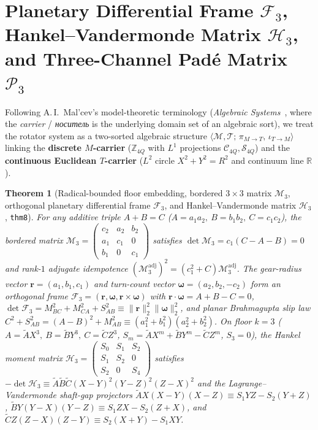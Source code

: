\documentclass[11pt,a4paper]{article}
\theoremstyle{plain}
\newtheorem{theorem}{Theorem}[section]
\theoremstyle{definition}
\begin{document}
\section{Planetary Differential Frame \texorpdfstring{$\mathcal{F}_3$}{F3}, Hankel--Vandermonde Matrix \texorpdfstring{$\mathcal{H}_3$}{H3}, and Three-Channel Pad\'e Matrix \texorpdfstring{$\mathcal{P}_3$}{P3}}
\label{sec:planetary-frame}

Following A.\,I.~Mal'cev's model-theoretic terminology (\emph{Algebraic Systems}~\cite{Malcev1973}, where the \emph{carrier} / \emph{носитель} is the underlying domain set of an algebraic sort), we treat the rotator system as a two-sorted algebraic structure $\langle\mathcal{M},\mathcal{T};\,\pi_{M\to T},\,\iota_{T\to M}\rangle$ linking the \textbf{discrete $M$-carrier} ($\mathbb{Z}_{4Q}$ with $L^1$ projections $\mathcal{C}_{4Q},\mathcal{S}_{4Q}$) and the \textbf{continuous Euclidean $T$-carrier} ($L^2$ circle $X^2+Y^2=R^2$ and continuum line $\mathbb{R}$).

\begin{theorem}[Radical-bounded floor embedding, bordered $3\times 3$ matrix $\mathcal{M}_3$, orthogonal planetary differential frame $\mathcal{F}_3$, and Hankel--Vandermonde matrix $\mathcal{H}_3$, \texttt{thm8}]
\label{thm:main-8}
For any additive triple $A + B = C$ ($A = a_1 a_2,\ B = b_1 b_2,\ C = c_1 c_2$), the bordered matrix $\mathcal{M}_3 = \begin{pmatrix} c_2 & a_2 & b_2 \\ a_1 & c_1 & 0 \\ b_1 & 0 & c_1 \end{pmatrix}$ satisfies $\det\mathcal{M}_3 = c_1(C-A-B) = 0$ and rank-$1$ adjugate idempotence $(\mathcal{M}_3^{\mathrm{adj}})^2 = (c_1^2+C)\mathcal{M}_3^{\mathrm{adj}}$. The gear-radius vector $\mathbf{r} = (a_1,b_1,c_1)$ and turn-count vector $\mathbf{\omega} = (a_2,b_2,-c_2)$ form an orthogonal frame $\mathcal{F}_3 = (\mathbf{r},\mathbf{\omega},\mathbf{r}\times\mathbf{\omega})$ with $\mathbf{r}\cdot\mathbf{\omega} = A+B-C = 0$, $\det\mathcal{F}_3 = M_{BC}^2 + M_{CA}^2 + S_{AB}^2 \equiv \|\mathbf{r}\|_2^2\|\mathbf{\omega}\|_2^2$, and planar Brahmagupta slip law $C^2 + S_{AB}^2 = (A-B)^2 + M_{AB}^2 \equiv (a_1^2+b_1^2)(a_2^2+b_2^2)$. On floor $k=3$ ($A = \widetilde{A}X^3,\ B = \widetilde{B}Y^3,\ C = \widetilde{C}Z^3$, $S_m = \widetilde{A}X^m + \widetilde{B}Y^m - \widetilde{C}Z^m$, $S_3 = 0$), the Hankel moment matrix $\mathcal{H}_3 = \begin{pmatrix} S_0 & S_1 & S_2 \\ S_1 & S_2 & 0 \\ S_2 & 0 & S_4 \end{pmatrix}$ satisfies $-\det\mathcal{H}_3 \equiv \widetilde{A}\widetilde{B}\widetilde{C}(X-Y)^2(Y-Z)^2(Z-X)^2$ and the Lagrange--Vandermonde shaft-gap projectors $\widetilde{A}X(X-Y)(X-Z) \equiv S_1 YZ - S_2(Y+Z)$, $\widetilde{B}Y(Y-X)(Y-Z) \equiv S_1 ZX - S_2(Z+X)$, and $\widetilde{C}Z(Z-X)(Z-Y) \equiv S_2(X+Y) - S_1 XY$.
\end{theorem}
\end{document}
